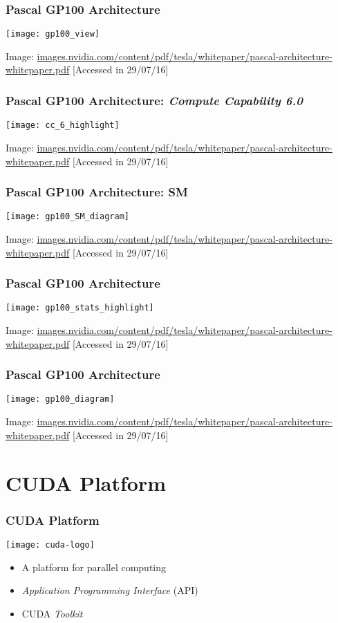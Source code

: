 \documentclass[10pt, compress]{beamer}
\begin{document}
\begin{frame}
    \frametitle{Pascal GP100 Architecture}
    \centering
    \texttt{[image: gp100\_view]}
    \vfill

    \tiny{Image: \url{images.nvidia.com/content/pdf/tesla/whitepaper/pascal-architecture-whitepaper.pdf} [Accessed in 29/07/16]}
\end{frame}

\begin{frame}
    \frametitle{Pascal GP100 Architecture: \textit{Compute Capability 6.0}}
    \centering
    \texttt{[image: cc\_6\_highlight]}
    \vfill

    \tiny{Image: \url{images.nvidia.com/content/pdf/tesla/whitepaper/pascal-architecture-whitepaper.pdf} [Accessed in 29/07/16]}
\end{frame}

\begin{frame}
    \frametitle{Pascal GP100 Architecture: SM}
    \centering
    \texttt{[image: gp100\_SM\_diagram]}
    \vfill

    \tiny{Image: \url{images.nvidia.com/content/pdf/tesla/whitepaper/pascal-architecture-whitepaper.pdf} [Accessed in 29/07/16]}
\end{frame}

\begin{frame}
    \frametitle{Pascal GP100 Architecture}
    \centering
    \texttt{[image: gp100\_stats\_highlight]}
    \vfill

    \tiny{Image: \url{images.nvidia.com/content/pdf/tesla/whitepaper/pascal-architecture-whitepaper.pdf} [Accessed in 29/07/16]}
\end{frame}

\begin{frame}
    \frametitle{Pascal GP100 Architecture}
    \centering
    \texttt{[image: gp100\_diagram]}
    \vfill

    \tiny{Image: \url{images.nvidia.com/content/pdf/tesla/whitepaper/pascal-architecture-whitepaper.pdf} [Accessed in 29/07/16]}
\end{frame}

\section{CUDA Platform}

\begin{frame}
    \frametitle{CUDA Platform}
    \begin{center}
        \texttt{[image: cuda-logo]}
    \end{center}
    \pause

    \begin{itemize}
        \item A platform for \alert{parallel computing}
        \item \textit{Application Programming Interface} (API)
        \item CUDA \textit{Toolkit}
    \end{itemize}
\end{frame}
\end{document}
